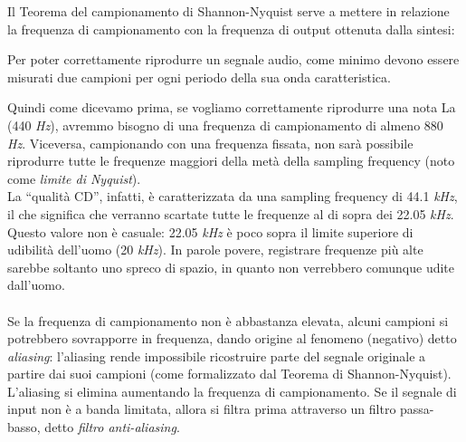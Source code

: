 		Il Teorema del campionamento di Shannon-Nyquist serve a mettere in relazione la frequenza di campionamento con la frequenza di output ottenuta dalla sintesi:
		
		\begin{teo} \label{teo:shannon_nyquist}
			Per poter correttamente riprodurre un segnale audio, come minimo devono essere misurati due campioni per ogni periodo della sua onda caratteristica.
		\end{teo}
		
		Quindi come dicevamo prima, se vogliamo correttamente riprodurre una nota La (440 \textit{Hz}), avremmo bisogno di una frequenza di campionamento di almeno 880 \textit{Hz}. Viceversa, campionando con una frequenza fissata, non sarà possibile riprodurre tutte le frequenze maggiori della metà della sampling frequency (noto come \textit{limite di Nyquist}).\\
		La ``qualità CD'', infatti, è caratterizzata da una sampling frequency di 44.1 \textit{kHz}, il che significa che verranno scartate tutte le frequenze al di sopra dei 22.05 \textit{kHz}. Questo valore non è casuale: 22.05 \textit{kHz} è poco sopra il limite superiore di udibilità dell'uomo (20 \textit{kHz}). In parole povere, registrare frequenze più alte sarebbe soltanto uno spreco di spazio, in quanto non verrebbero comunque udite dall'uomo.\\
		\\
		Se la frequenza di campionamento non è abbastanza elevata, alcuni campioni si potrebbero sovrapporre in frequenza, dando origine al fenomeno (negativo) detto \textit{aliasing}: l'aliasing rende impossibile ricostruire parte del segnale originale a partire dai suoi campioni (come formalizzato dal Teorema di Shannon-Nyquist). L'aliasing si elimina aumentando la frequenza di campionamento. Se il segnale di input non è a banda limitata, allora si filtra prima attraverso un filtro passa-basso, detto \textit{filtro anti-aliasing}.